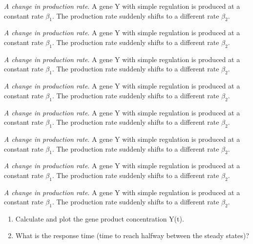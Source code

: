 \begin{exerciselist}


\item \textit{A change in production rate}. A gene Y with simple regulation is produced at a constant rate $\beta 
_{1}$. The production rate suddenly shifts to a different rate $\beta 
_{2}$.

\item \textit{A change in production rate}. A gene Y with simple regulation is produced at a constant rate $\beta 
_{1}$. The production rate suddenly shifts to a different rate $\beta 
_{2}$.

\item \textit{A change in production rate}. A gene Y with simple regulation is produced at a constant rate $\beta 
_{1}$. The production rate suddenly shifts to a different rate $\beta 
_{2}$.

\item \textit{A change in production rate}. A gene Y with simple regulation is produced at a constant rate $\beta 
_{1}$. The production rate suddenly shifts to a different rate $\beta 
_{2}$.

\item \textit{A change in production rate}. A gene Y with simple regulation is produced at a constant rate $\beta 
_{1}$. The production rate suddenly shifts to a different rate $\beta 
_{2}$.

\item \textit{A change in production rate}. A gene Y with simple regulation is produced at a constant rate $\beta 
_{1}$. The production rate suddenly shifts to a different rate $\beta 
_{2}$.


\item \textit{A change in production rate}. A gene Y with simple regulation is produced at a constant rate $\beta 
_{1}$. The production rate suddenly shifts to a different rate $\beta 
_{2}$.

\item \textit{A change in production rate}. A gene Y with simple regulation is produced at a constant rate $\beta 
_{1}$. The production rate suddenly shifts to a different rate $\beta 
_{2}$.

\begin{enumerate}
\item Calculate and plot the gene product concentration Y(t).

\item What is the response time (time to reach halfway between the steady 
states)?
\end{enumerate}


\end{exerciselist}
